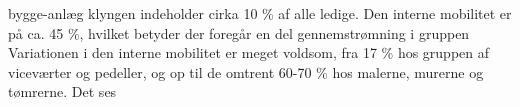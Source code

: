 bygge-anlæg klyngen indeholder cirka 10 \% af alle ledige. Den interne mobilitet er på ca. 45 \%, hvilket betyder der foregår en del gennemstrømning i gruppen %
Variationen i den interne mobilitet er meget voldsom, fra 17 \% hos gruppen af viceværter og pedeller, og op til de omtrent 60-70 \% hos malerne, murerne og tømrerne. Det ses  








